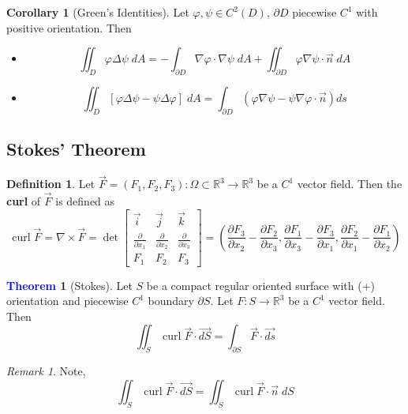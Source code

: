 \documentclass[11pt]{article}
\theoremstyle{definition}
\theoremstyle{definition}
\newcommand{\R}[0]{\mathbb{R}}
\DeclareMathOperator{\curl}{curl}
\newtheorem{theorem}{\textcolor{blue}{Theorem}}
\newtheorem{corollary}{Corollary}
\theoremstyle{definition}
\newtheorem{definition}{\textcolor{OliveGreen}{Definition}}
\theoremstyle{remark}
\newtheorem*{remark}{Remark}
\begin{document}
\begin{corollary}[Green's Identities]
    Let $\varphi, \psi \in C^2(D)$, $\partial D$ piecewise $C^1$ with positive orientation. Then
    \begin{itemize}
        \item \[ \iint_D \varphi \Delta \psi \; dA = - \int_{\partial D} \nabla \varphi \cdot \nabla \psi \; dA + \iint_{\partial D} \varphi \nabla \psi \cdot \vec{n} \; dA \]
        \item \[ \iint_D \left[ \varphi \Delta \psi- \psi \Delta \varphi \right] \; dA = \int_{\partial D} \left( \varphi \nabla \psi - \psi \nabla \varphi \cdot \vec{n} \right) ds \]
    \end{itemize}    
    
\end{corollary}

\subsection{Stokes' Theorem}


\begin{definition}
    Let $\vec{F} = (F_1, F_2, F_3): \Omega \subset \R^3 \to \R^3$ be a $C^1$ vector field. Then the \textbf{curl} of $\vec{F}$ is defined as
    \[
        \curl \vec{F} = \nabla \times \vec{F} = \det \begin{bmatrix}
        \vec{i} & \vec{j} & \vec{k} \\
        \frac{\partial}{\partial x_1} & \frac{\partial}{\partial x_2} & \frac{\partial}{\partial x_3} \\
        F_1 & F_2 & F_3
        \end{bmatrix}
        = \left( \frac{\partial F_3}{\partial x_2} - \frac{\partial F_2}{\partial x_3}, \frac{\partial F_1}{\partial x_3} - \frac{\partial F_3}{\partial x_1}, \frac{\partial F_2}{\partial x_1} - \frac{\partial F_1}{\partial x_2} \right)
    \]    
\end{definition}

\begin{theorem}[Stokes]
    Let $S$ be a compact regular oriented surface with (+) orientation and piecewise $C^1$ boundary $\partial S$. Let $F : S \to \R^3$ be a $C^1$ vector field.
    Then
    \[
        \iint_S \curl \vec{F} \cdot \vec{dS} = \int_{\partial S} \vec{F} \cdot \vec{ds}
    \]      
\end{theorem}

\begin{remark}
    Note, 
    \[
        \iint_S \curl \vec{F} \cdot \vec{dS} = \iint_S \curl \vec{F} \cdot \vec{n} \; dS
    \] 
\end{remark}
\end{document}
